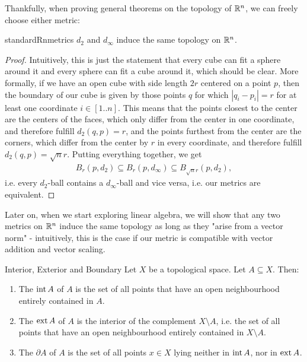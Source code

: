  Thankfully, when proving general theorems on the topology of $\mathbb{R}^n$, we can freely choose either metric:
\begin{importanttheorem}{}{standardRnmetrics}
	$d_2$ and $d_\infty$ induce the same topology on $\mathbb{R}^n$.
\end{importanttheorem}
\begin{proof}
	Intuitively, this is just the statement that every cube can fit a sphere around it and every sphere can fit a cube around it, which should be clear. 
	\newpar
	More formally, if we have an open cube with side length $2r$ centered on a point $p$, then the boundary of our cube is given by those points $q$ for which $|q_i - p_i| = r$ for at least one coordinate $i \in [1..n]$. 
	\newpar
	This means that the points closest to the center are the centers of the faces, which only differ from the center in one coordinate, and therefore fulfill $d_2(q,p) = r$, and the points furthest from the center are the corners, which differ from the center by $r$ in every coordinate, and therefore fulfill $d_2(q,p) = \sqrt{n}r$. Putting everything together, we get
	\begin{align*}
		B_r(p, d_2) \subseteq B_r(p, d_\infty) \subseteq B_{\sqrt{n}r}(p, d_2),
	\end{align*}
	i.e. every $d_2$-ball contains a $d_\infty$-ball and vice versa, i.e. our metrics are equivalent.
\end{proof}
Later on, when we start exploring linear algebra, we will show that any two metrics on $\mathbb{R}^n$ induce the same topology as long as they "arise from a vector norm" - intuitively, this is the case if our metric is compatible with vector addition and vector scaling.
\begin{importantdefinition}{Interior, Exterior and Boundary}{}
	Let $X$ be a topological space. Let $A \subseteq X$. Then:
	\begin{enumerate}
		\item The  $\operatorname{int} A$ of $A$ is the set of all points that have an open neighbourhood entirely contained in $A$.
		\item The  $\operatorname{ext} A$ of $A$ is the interior of the complement $X \setminus A$, i.e. the set of all points that have an open neighbourhood entirely contained in $X \setminus A$.
		\item The  $\partial A$ of $A$ is the set of all points $x \in X$ lying neither in $\operatorname{int} A$, nor in $\operatorname{ext} A$.
	\end{enumerate}
\end{importantdefinition}
